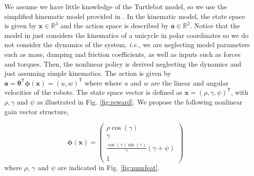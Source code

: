 \documentclass{aamas2016}
\renewcommand{\Re}{\mathbb{R}}
\newcommand{\transpose}{\text{$\mathsf{T}$}}
\begin{document}

We assume we have little knowledge of the Turtlebot model, so we use the simplified kinematic model provided in \cite{aicardi1994closed}.
In the kinematic model, the state space is given by $\boldsymbol{x} \in \Re^3$ and the action space is described by 
$\boldsymbol{a} \in \Re^2$. Notice that the model in \cite{aicardi1994closed} just considers the kinematics of a unicycle in polar coordinates
so we do not consider the dynamics of the system, \emph{i.e.,} we are neglecting model parameters such as mass, damping and friction 
coefficients, as well as inputs such as forces and torques. Then, the nonlinear policy is derived neglecting the dynamics and just assuming
simple kinematics. The action is given by 
$\boldsymbol{a} = \boldsymbol{\theta}^\transpose\boldsymbol{\phi}(\boldsymbol{x}) = (u,w)^\transpose$
where where $u$ and $w$ are the linear and angular velocities of the robots. The state space vector is defined as  $\boldsymbol{x} = (\rho,\gamma,\psi)^\transpose$, with $\rho,\gamma$ and $\psi$ as illustrated in Fig. \ref{fig:reward}. We propose the following nonlinear gain vector
structure,

\begin{equation} \label{eqn:state}
	\boldsymbol{\phi}(\boldsymbol{x}) = \left(\begin{array}{c} \rho \cos(\gamma) \\ \gamma \\ \frac{\cos(\gamma)\sin(\gamma)}{\gamma}\left(\gamma + \psi \right) \\ 1 \end{array}\right) \enspace
\end{equation}
where $\rho$, $\gamma$ and $\psi$ are indicated in Fig. \ref{fig:numfeat}.
\end{document}

